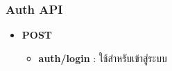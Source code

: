 \subsubsection{Auth API}

\ifenglish
\else
\begin{itemize}
    \item \textbf{POST}
    \begin{itemize}
        \item \textbf{auth/login} : ใช้สำหรับเข้าสู่ระบบ
    \end{itemize}
\end{itemize}
\fi
